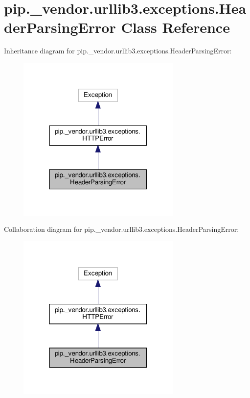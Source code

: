 \hypertarget{classpip_1_1__vendor_1_1urllib3_1_1exceptions_1_1HeaderParsingError}{}\section{pip.\+\_\+vendor.\+urllib3.\+exceptions.\+Header\+Parsing\+Error Class Reference}
\label{classpip_1_1__vendor_1_1urllib3_1_1exceptions_1_1HeaderParsingError}


Inheritance diagram for pip.\+\_\+vendor.\+urllib3.\+exceptions.\+Header\+Parsing\+Error\+:
\nopagebreak
\begin{figure}[H]
\begin{center}
\leavevmode
\includegraphics[width=229pt]{classpip_1_1__vendor_1_1urllib3_1_1exceptions_1_1HeaderParsingError__inherit__graph}
\end{center}
\end{figure}


Collaboration diagram for pip.\+\_\+vendor.\+urllib3.\+exceptions.\+Header\+Parsing\+Error\+:
\nopagebreak
\begin{figure}[H]
\begin{center}
\leavevmode
\includegraphics[width=229pt]{classpip_1_1__vendor_1_1urllib3_1_1exceptions_1_1HeaderParsingError__coll__graph}
\end{center}
\end{figure}
